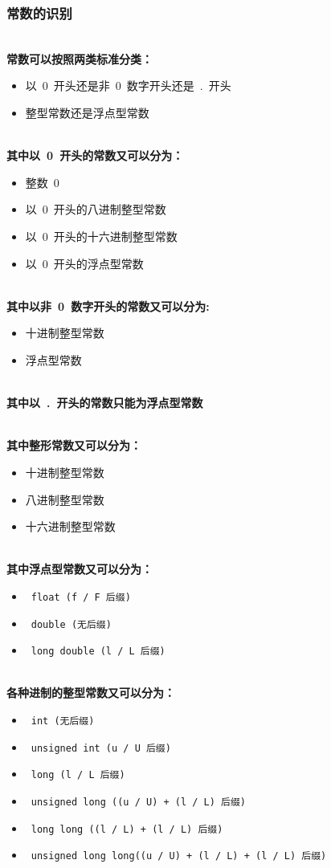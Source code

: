 \documentclass[lang=cn,11pt,a4paper]{paper}
\begin{document}
\subsubsection{常数的识别}
~\\
\textbf{常数可以按照两类标准分类：}
\begin{itemize}
    \item 以\ 0\ 开头还是非\ 0\ 数字开头还是\ .\ 开头
    \item 整型常数还是浮点型常数
\end{itemize}
~\\
\textbf{其中以\ 0\ 开头的常数又可以分为：}
\begin{itemize}
    \item 整数\ 0
    \item 以\ 0\ 开头的八进制整型常数
    \item 以\ 0\ 开头的十六进制整型常数
    \item 以\ 0\ 开头的浮点型常数
\end{itemize}
~\\
\textbf{其中以非\ 0\ 数字开头的常数又可以分为:}
\begin{itemize}
    \item 十进制整型常数
    \item 浮点型常数
\end{itemize}
~\\
\textbf{其中以\ .\ 开头的常数只能为浮点型常数}

~\\
\textbf{其中整形常数又可以分为：}
\begin{itemize}
    \item 十进制整型常数
    \item 八进制整型常数
    \item 十六进制整型常数
\end{itemize}
~\\
\textbf{其中浮点型常数又可以分为：}
\begin{itemize}
    \item\ \lstinline{float (f / F 后缀)}
    \item\ \lstinline{double (无后缀)}
    \item\ \lstinline{long double (l / L 后缀)}
\end{itemize}
~\\
\textbf{各种进制的整型常数又可以分为：}
\begin{itemize}
    \item\ \lstinline{int (无后缀)}
    \item\ \lstinline{unsigned int (u / U 后缀)}
    \item\ \lstinline{long (l / L 后缀)}
    \item\ \lstinline{unsigned long ((u / U) + (l / L) 后缀)}
    \item\ \lstinline{long long ((l / L) + (l / L) 后缀)}
    \item\ \lstinline{unsigned long long((u / U) + (l / L) + (l / L) 后缀)}
\end{itemize}
~\\
\end{document}
